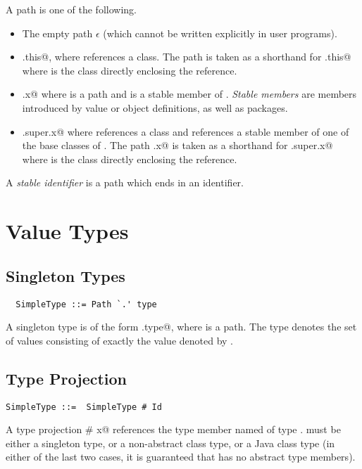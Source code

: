 \documentclass[11pt]{report}
\begin{document}
A path is one of the following.
\begin{itemize}
\item
The empty path $\epsilon$ (which cannot be written explicitly in user programs).
\item
\verb@C.this@, where \verb@C@ references a class. 
The path \verb@this@ is taken as a shorthand for \verb@C.this@ where 
\verb@C@ is the class directly enclosing the reference. 
\item
\verb@p.x@ where \verb@p@ is a path and \verb@x@ is a stable member of \verb@p@.
{\em Stable members} are members introduced by value or object
definitions, as well as packages.
\item
\verb@C.super.x@ where \verb@C@ references a class and \verb@x@ references a 
stable member of
one of the base classes of \verb@C@. 
The path \verb@super.x@ is taken as a shorthand for \verb@C.super.x@ where 
\verb@C@ is the class directly enclosing the reference. 
\end{itemize}
A {\em stable identifier} is a path which ends in an identifier.

\section{Value Types}

\subsection{Singleton Types}
\label{sec:singleton-type}

\syntax\begin{verbatim}
  SimpleType ::= Path `.' type
\end{verbatim}

A singleton type is of the form \verb@p.type@, where \verb@p@ is a
path.  The type denotes the set of values consisting of
exactly the value denoted by \verb@p@.

\subsection{Type Projection}
\label{sec:type-project}

\syntax\begin{verbatim} 
SimpleType ::=  SimpleType # Id
\end{verbatim}

A type projection \verb@T # x@ references the type member named 
\verb@x@ of type \verb@T@. \verb@T@ must be either a singleton type,
or a non-abstract class type, or a Java class type (in either of the
last two cases, it is guaranteed that \verb@T@ has no abstract type
members).
\end{document}
